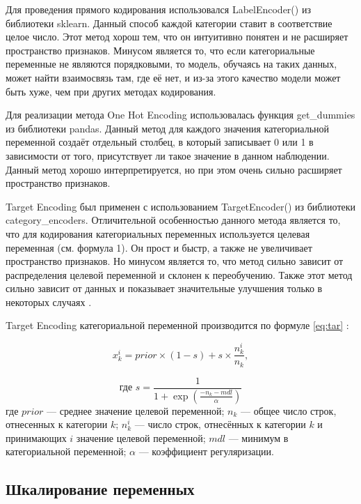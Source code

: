 \documentclass[14pt]{mmcs_article}
\begin{document}
Для проведения прямого кодирования использовался LabelEncoder() из библиотеки sklearn. Данный способ каждой категории ставит в соответствие целое число. Этот метод хорош тем, что он интуитивно понятен и не расширяет пространство признаков. Минусом является то, что если категориальные переменные не являются порядковыми, то модель, обучаясь на таких данных, может найти взаимосвязь там, где её нет, и из-за этого качество модели может быть хуже, чем при других методах кодирования.

Для реализации метода One Hot Encoding использовалась функция get\_dummies из библиотеки pandas. Данный метод для каждого значения категориальной переменной создаёт отдельный столбец, в который записывает 0 или 1 в зависимости от того, присутствует ли такое значение в данном наблюдении. Данный метод хорошо интерпретируется, но при этом очень сильно расширяет пространство признаков. 

Target Encoding был применен с использованием TargetEncoder() из библиотеки category\_encoders. Отличительной особенностью данного метода является то, что для кодирования категориальных переменных используется целевая переменная (см. формула 1). Он прост и быстр, а также не увеличивает пространство признаков. Но минусом является то, что метод сильно зависит от распределения целевой переменной и склонен к переобучению. Также этот метод сильно зависит от данных и показывает значительные улучшения только в некоторых случаях \cite{lib:encoding}.

Target Encoding категориальной переменной производится по формуле \ref{eq:tar} \cite{lib:tarencode}:

\begin{equation}\label{eq:tar}
	x^i_k=prior \times (1-s)+s \times \frac{n^i_k}{n_k},
\end{equation}

\begin{equation*}
	\text{где } s = \frac{1}{1 + \exp \left( \frac{-n_k-mdl}{\alpha} \right)}
\end{equation*}
где $prior$ --- среднее значение целевой переменной;  $n_k$ --- общее число строк, отнесенных к категории $k$; $n^i_k$ --- число строк, отнесённых к категории $k$ и принимающих $i$ значение целевой переменной; $mdl$ --- минимум в категориальной переменной; $\alpha$ --- коэффициент регуляризации.


\subsection{Шкалирование переменных}
\end{document}
